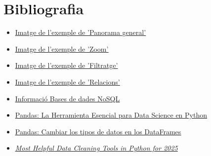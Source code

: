 \documentclass[a4paper,12pt]{report}
\begin{document}
\section*{Bibliografia}
\begin{itemize}
    \item \href{https://evotic.es/wp-content/uploads/2022/10/dashboard_ventas.png}{\underline{Imatge de l'exemple de 'Panorama general'}}
    \item \href{https://r-charts.com/es/correlacion/zoom-grafico_files/figure-html/zoom.png}{\underline{Imatge de l'exemple de 'Zoom'}}
    \item \href{https://cdn.exceltotal.com/wp-content/uploads/2014/02/filtros-en-excel-03.png}{\underline{Imatge de l'exemple de 'Filtratge'}}
    \item \href{https://cdn.kastatic.org/ka-perseus-images/8aa21944eef2879cea9080a2ae2fbcb98cec0ddf.png}{\underline{Imatge de l'exemple de 'Relacions'}}
    \item \href{https://www.arsys.es/blog/bases-de-datos-nosql-que-son-tipos-y-ventajas#tree-3}{\underline{Informació Bases de dades NoSQL}}
    \item \href{https://iddigitalschool.com/bootcamps/que-es-pandas/#:~:text=Funcionalidades%20Clave,filtrar%2C%20agregar%20y%20resumir%20datos.}{\underline{Pandas: La Herramienta Esencial para Data Science en Python}}
    \item \href{https://www.analyticslane.com/2021/07/15/pandas-cambiar-los-tipos-de-datos-en-los-dataframes/}{\underline{Pandas: Cambiar los tipos de datos en los DataFrames}}
    \item \href{https://hevodata.com/learn/guide-to-effective-data-cleaning-tools-in-python/#:~:text=1.-,Pandas,your%20data%20for%20further%20exploration.}{\underline{\textit{Most Helpful Data Cleaning Tools in Python for 2025}}}
\end{itemize}
\end{document}
